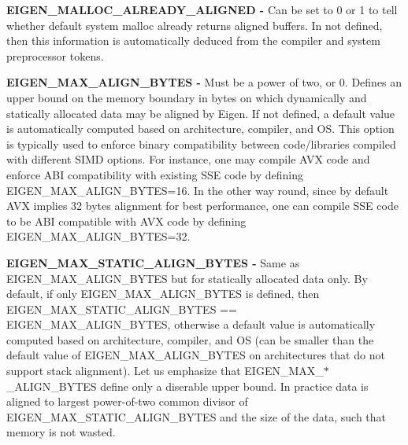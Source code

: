 \begin{DoxyItemize}
\item {\bfseries {\ttfamily E\+I\+G\+E\+N\+\_\+\+M\+A\+L\+L\+O\+C\+\_\+\+A\+L\+R\+E\+A\+D\+Y\+\_\+\+A\+L\+I\+G\+N\+ED} -\/} Can be set to 0 or 1 to tell whether default system {\ttfamily malloc} already returns aligned buffers. In not defined, then this information is automatically deduced from the compiler and system preprocessor tokens.
\item {\bfseries {\ttfamily E\+I\+G\+E\+N\+\_\+\+M\+A\+X\+\_\+\+A\+L\+I\+G\+N\+\_\+\+B\+Y\+T\+ES} -\/} Must be a power of two, or 0. Defines an upper bound on the memory boundary in bytes on which dynamically and statically allocated data may be aligned by Eigen. If not defined, a default value is automatically computed based on architecture, compiler, and OS. This option is typically used to enforce binary compatibility between code/libraries compiled with different S\+I\+MD options. For instance, one may compile A\+VX code and enforce A\+BI compatibility with existing S\+SE code by defining {\ttfamily E\+I\+G\+E\+N\+\_\+\+M\+A\+X\+\_\+\+A\+L\+I\+G\+N\+\_\+\+B\+Y\+T\+ES=16}. In the other way round, since by default A\+VX implies 32 bytes alignment for best performance, one can compile S\+SE code to be A\+BI compatible with A\+VX code by defining {\ttfamily E\+I\+G\+E\+N\+\_\+\+M\+A\+X\+\_\+\+A\+L\+I\+G\+N\+\_\+\+B\+Y\+T\+ES=32}.
\item {\bfseries {\ttfamily E\+I\+G\+E\+N\+\_\+\+M\+A\+X\+\_\+\+S\+T\+A\+T\+I\+C\+\_\+\+A\+L\+I\+G\+N\+\_\+\+B\+Y\+T\+ES} -\/} Same as {\ttfamily E\+I\+G\+E\+N\+\_\+\+M\+A\+X\+\_\+\+A\+L\+I\+G\+N\+\_\+\+B\+Y\+T\+ES} but for statically allocated data only. By default, if only {\ttfamily E\+I\+G\+E\+N\+\_\+\+M\+A\+X\+\_\+\+A\+L\+I\+G\+N\+\_\+\+B\+Y\+T\+ES} is defined, then {\ttfamily E\+I\+G\+E\+N\+\_\+\+M\+A\+X\+\_\+\+S\+T\+A\+T\+I\+C\+\_\+\+A\+L\+I\+G\+N\+\_\+\+B\+Y\+T\+ES} == {\ttfamily E\+I\+G\+E\+N\+\_\+\+M\+A\+X\+\_\+\+A\+L\+I\+G\+N\+\_\+\+B\+Y\+T\+ES}, otherwise a default value is automatically computed based on architecture, compiler, and OS (can be smaller than the default value of E\+I\+G\+E\+N\+\_\+\+M\+A\+X\+\_\+\+A\+L\+I\+G\+N\+\_\+\+B\+Y\+T\+ES on architectures that do not support stack alignment). Let us emphasize that {\ttfamily E\+I\+G\+E\+N\+\_\+\+M\+A\+X\+\_\+$\ast$\+\_\+\+A\+L\+I\+G\+N\+\_\+\+B\+Y\+T\+ES} define only a diserable upper bound. In practice data is aligned to largest power-\/of-\/two common divisor of {\ttfamily E\+I\+G\+E\+N\+\_\+\+M\+A\+X\+\_\+\+S\+T\+A\+T\+I\+C\+\_\+\+A\+L\+I\+G\+N\+\_\+\+B\+Y\+T\+ES} and the size of the data, such that memory is not wasted.

\end{DoxyItemize}
